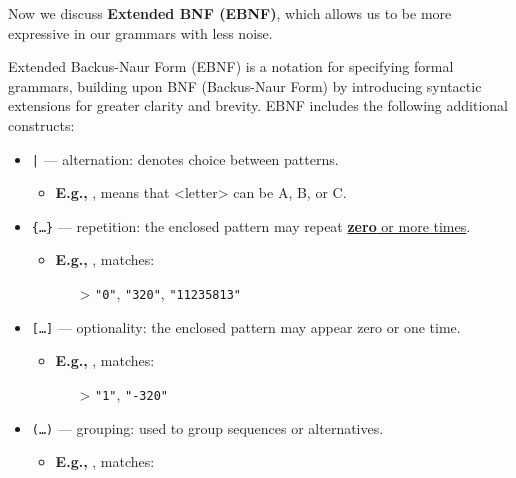 \noindent
Now we discuss \textbf{Extended BNF (EBNF)}, which allows us to be more expressive in our grammars with less noise.

\begin{Def}

\label{def:ebnf}
Extended Backus-Naur Form (EBNF) is a notation for specifying formal grammars, building upon BNF (Backus-Naur Form) by introducing syntactic extensions for greater clarity and brevity.
EBNF includes the following additional constructs:

\begin{itemize}
    
    \item \texttt{|} — alternation: denotes choice between patterns.
    \begin{itemize}
        \item \textbf{E.g.,}  , means that <letter> can be A, B, or C.
    \end{itemize}
    \item \texttt{\{\ldots \}} — repetition: the enclosed pattern may repeat \underline{\textbf{zero} or more times}.
    \begin{itemize}
        \item \textbf{E.g.,}  , matches:
        \begin{itemize}
            \item[>] \texttt{"0"}, \texttt{"320"}, \texttt{"11235813"}
        \end{itemize}
    \end{itemize}
    \item \texttt{[\ldots ]} — optionality: the enclosed pattern may appear zero or one time.
    \begin{itemize}
        \item \textbf{E.g.,} , matches:
        \begin{itemize}
            \item[>] \texttt{"1"}, \texttt{"-320"}
        \end{itemize}
    \end{itemize}
    \item \texttt{(\ldots )} — grouping: used to group sequences or alternatives.
    \begin{itemize}
        \item \textbf{E.g.,} , matches:

\end{itemize}
\end{itemize}
\end{Def}
